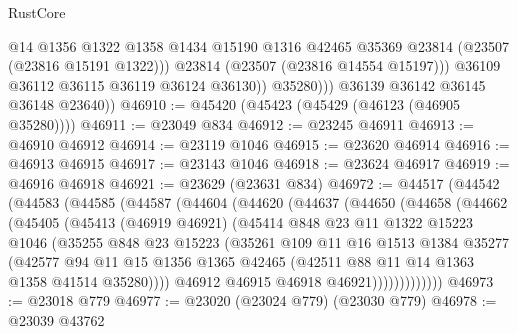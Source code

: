 \begin{lexlean}{RustCore}
\begin{coremodule}
                      @14
                      @1356
                      @1322
                      @1358
                      @1434
                      @15190
                      @1316
                      @42465
                      @35369
                      @23814
                      (@23507 (@23816 @15191 @1322)))
                    @23814
                    (@23507 (@23816 @14554 @15197)))
                  @36109
                  @36112
                  @36115
                  @36119
                  @36124
                  @36130))
              @35280)))
        @36139
        @36142
        @36145
        @36148
        @23640))
@46910 := @45420 (@45423 (@45429 (@46123 (@46905 @35280))))
@46911 := @23049 @834
@46912 := @23245 @46911
@46913 := @46910 @46912
@46914 := @23119 @1046
@46915 := @23620 @46914
@46916 := @46913 @46915
@46917 := @23143 @1046
@46918 := @23624 @46917
@46919 := @46916 @46918
@46921 := @23629 (@23631 @834)
@46972 := @44517
    (@44542
      (@44583
        (@44585
          (@44587
            (@44604
              (@44620
                (@44637
                  (@44650
                    (@44658
                      (@44662
                        (@45405
                          (@45413
                            (@46919 @46921)
                            (@45414
                              @848
                              @23
                              @11
                              @1322
                              @15223
                              @1046
                              (@35255
                                @848
                                @23
                                @15223
                                (@35261
                                  @109
                                  @11
                                  @16
                                  @1513
                                  @1384
                                  @35277
                                  (@42577
                                    @94
                                    @11
                                    @15
                                    @1356
                                    @1365
                                    @42465
                                    (@42511 @88 @11 @14 @1363 @1358 @41514 @35280))))
                              @46912
                              @46915
                              @46918
                              @46921)))))))))))))
@46973 := @23018 @779
@46977 := @23020 (@23024 @779) (@23030 @779)
@46978 := @23039 @43762

\end{coremodule}
\end{lexlean}
